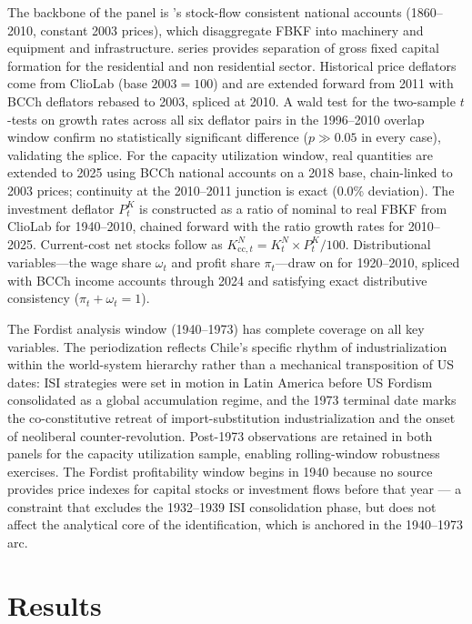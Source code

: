 \documentclass[11pt,a4paper]{article}
\begin{document}
{The backbone of the panel is \citet{PerezEyzaguirre2019}'s stock-flow consistent national accounts (1860--2010, constant 2003 prices), which disaggregate FBKF into machinery and equipment and infrastructure. \citet{Hofman2000} series provides separation of gross fixed capital formation for the residential and non residential sector. Historical price deflators come from ClioLab (base $2003=100$) and are extended forward from 2011 with BCCh deflators rebased to 2003, spliced at 2010. A wald test for the two-sample $t$-tests on growth rates across all six deflator pairs in the 1996--2010 overlap window confirm no statistically significant difference ($p \gg 0.05$ in every case), validating the splice. For the capacity utilization window, real quantities are extended to 2025 using BCCh national accounts on a 2018 base, chain-linked to 2003 prices; continuity at the 2010--2011 junction is exact (0.0\% deviation). The investment deflator $P^K_t$ is constructed as a ratio of nominal to real FBKF from ClioLab for 1940--2010, chained forward with the ratio growth rates for 2010--2025. Current-cost net stocks follow as $K^N_{\text{cc},t} = K^N_t \times P^K_t / 100$. Distributional variables---the wage share $\omega_t$ and profit share $\pi_t$---draw on \citet{Astorga2023} for 1920--2010, spliced with BCCh income accounts through 2024 and satisfying exact distributive consistency ($\pi_t + \omega_t = 1$).

The Fordist analysis window (1940--1973) has complete coverage on all key variables. The periodization reflects Chile's specific rhythm of industrialization within the world-system hierarchy rather than a mechanical transposition of US dates: ISI strategies were set in motion in Latin America before US Fordism consolidated as a global accumulation regime, and the 1973 terminal date marks the co-constitutive retreat of import-substitution industrialization and the onset of neoliberal counter-revolution. Post-1973 observations are retained in both panels for the capacity utilization sample, enabling rolling-window robustness exercises. The Fordist profitability window begins in 1940 because no source provides price indexes for capital stocks or investment flows before that year --- a constraint that excludes the 1932--1939 ISI consolidation phase, but does not affect the analytical core of the identification, which is anchored in the 1940--1973 arc. 

\section{Results}
\label{sec:results}

}
\end{document}

